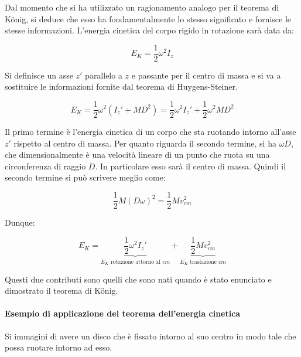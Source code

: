 Dal momento che si ha utilizzato un ragionamento analogo per il teorema di K\"onig, si deduce che esso ha fondamentalmente lo stesso significato e fornisce le stesse informazioni. L'energia cinetica del corpo rigido in rotazione sarà data da:

\[
	E_K = \frac{1}{2} \omega^2 I_z
\]

Si definisce un asse $z'$ parallelo a $z$ e passante per il centro di massa e si va a sostituire le informazioni fornite dal teorema di Huygens-Steiner.

\[
	E_K = \frac{1}{2} \omega^2 (I_z' + MD^2) = \frac{1}{2} \omega^2 I_z' + \frac{1}{2} \omega^2 MD^2
\]

Il primo termine è l'energia cinetica di un corpo che sta ruotando intorno all'asse $z'$ rispetto al centro di massa. Per quanto riguarda il secondo termine, si ha $\omega D$, che dimensionalmente è una velocità lineare di un punto che ruota su una circonferenza di raggio $D$. In particolare esso sarà il centro di massa. Quindi il secondo termine si può scrivere meglio come:

\[
	\frac{1}{2} M(D\omega)^2 = \frac{1}{2} Mv_{cm}^2
\]

Dunque:

\[
	E_K = \underbrace{\frac{1}{2} \omega^2 I_z'}_{E_K\text{ rotazione attorno al }cm  } + \underbrace{\frac{1}{2} Mv_{cm}^2}_{E_K\text{ traslazione } cm }
\]

Questi due contributi sono quelli che sono nati quando è stato enunciato e dimostrato il teorema di K\"onig.

\paragraph{Esempio di applicazione del teorema dell'energia cinetica} Si immagini di avere un disco che è fissato intorno al suo centro in modo tale che possa ruotare intorno ad esso.

